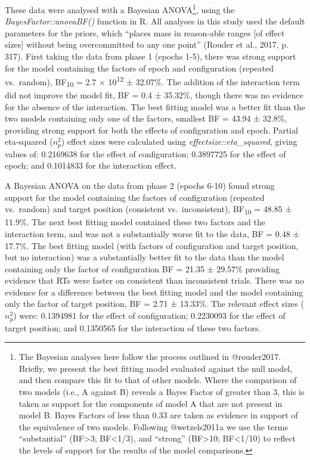 \documentclass[
  man,
  floatsintext,
  longtable,
  nolmodern,
  notxfonts,
  notimes,
  colorlinks=true,linkcolor=blue,citecolor=blue,urlcolor=blue]{apa7}
\begin{document}
These data were analysed with a Bayesian ANOVA\footnote{The Bayesian
  analyses here follow the process outlined in @rouder2017. Briefly, we
  present the best fitting model evaluated against the null model, and
  then compare this fit to that of other models. Where the comparison of
  two models (i.e., A against B) reveals a Bayes Factor of greater than
  3, this is taken as support for the components of model A that are not
  present in model B. Bayes Factors of less than 0.33 are taken as
  evidence in support of the equivalence of two models. Following
  @wetzels2011a we use the terms ``substantial'' (BF\textgreater3;
  BF\textless1/3), and ``strong'' (BF\textgreater10; BF\textless1/10) to
  reflect the levels of support for the results of the model
  comparisons.}, using the \emph{BayesFactor::anovaBF()} function in R.
All analyses in this study used the default parameters for the priors,
which ``places mass in reason-able ranges {[}of effect sizes{]} without
being overcommitted to any one point'' (Rouder et al., 2017, p. 317).
First taking the data from phase 1 (epochs 1-5), there was strong
support for the model containing the factors of epoch and configuration
(repeated vs.~random), BF\textsubscript{10} = 2.7 ×
10\textsuperscript{12} ± 32.07\%. The addition of the interaction term
did not improve the model fit, BF = 0.4 ± 35.32\%, though there was no
evidence for the absence of the interaction. The best fitting model was
a better fit than the two models containing only one of the factors,
smallest BF = 43.94 ± 32.8\%, providing strong support for both the
effects of configuration and epoch. Partial eta-squared (\(n^2_p\))
effect sizes were calculated using \emph{effectsize::eta\_squared},
giving values of: 0.2169638 for the effect of configuration; 0.3897725
for the effect of epoch; and 0.1014833 for the interaction effect.

A Bayesian ANOVA on the data from phase 2 (epochs 6-10) found strong
support for the model containing the factors of configuration (repeated
vs.~random) and target position (consistent vs.~inconsistent),
BF\textsubscript{10} = 48.85 ± 11.9\%. The next best fitting model
contained these two factors and the interaction term, and was not a
substantially worse fit to the data, BF = 0.48 ± 17.7\%. The best
fitting model (with factors of configuration and target position, but no
interaction) was a substantially better fit to the data than the model
containing only the factor of configuration BF = 21.35 ± 29.57\%
providing evidence that RTs were faster on consistent than inconsistent
trials. There was no evidence for a difference between the best fitting
model and the model containing only the factor of target position, BF =
2.71 ± 13.33\%. The relevant effect sizes (\(n^2_p\)) were: 0.1394981
for the effect of configuration; 0.2230093 for the effect of target
position; and 0.1350565 for the interaction of these two factors.
\end{document}
